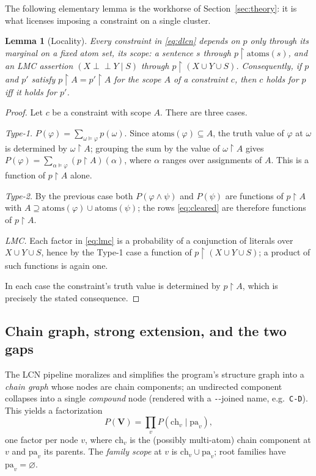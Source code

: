 \documentclass[11pt]{article}
\newtheorem{lemma}{Lemma}
\theoremstyle{definition}
\newcommand{\indep}{\perp\!\!\!\perp}
\newcommand{\ch}{\mathrm{ch}}
\newcommand{\pa}{\mathrm{pa}}
\newcommand{\atoms}{\mathrm{atoms}}
\newcommand{\restr}{\!\restriction\!}
\begin{document}
The following elementary lemma is the workhorse of Section~\ref{sec:theory}: it
is what licenses imposing a constraint on a single cluster.

\begin{lemma}[Locality]\label{lem:locality}
Every constraint in \eqref{eq:dlcn} depends on $p$ only through its marginal on a
fixed atom set, its \emph{scope}: a sentence $s$ through $p\restr\atoms(s)$, and
an LMC assertion $(X\indep Y\mid S)$ through $p\restr(X\cup Y\cup S)$.
Consequently, if $p$ and $p'$ satisfy $p\restr A=p'\restr A$ for the scope $A$ of
a constraint $c$, then $c$ holds for $p$ iff it holds for $p'$.
\end{lemma}

\begin{proof}
Let $c$ be a constraint with scope $A$. There are three cases.

\emph{Type-1.} $P(\varphi)=\sum_{\omega\models\varphi}p(\omega)$. Since
$\atoms(\varphi)\subseteq A$, the truth value of $\varphi$ at $\omega$ is
determined by $\omega\restr A$; grouping the sum by the value of $\omega\restr A$
gives $P(\varphi)=\sum_{\alpha\models\varphi}(p\restr A)(\alpha)$, where
$\alpha$ ranges over assignments of $A$. This is a function of $p\restr A$ alone.

\emph{Type-2.} By the previous case both $P(\varphi\wedge\psi)$ and $P(\psi)$
are functions of $p\restr A$ with
$A\supseteq\atoms(\varphi)\cup\atoms(\psi)$; the rows \eqref{eq:cleared} are
therefore functions of $p\restr A$.

\emph{LMC.} Each factor in \eqref{eq:lmc} is a probability of a conjunction of
literals over $X\cup Y\cup S$, hence by the Type-1 case a function of
$p\restr(X\cup Y\cup S)$; a product of such functions is again one.

In each case the constraint's truth value is determined by $p\restr A$, which is
precisely the stated consequence.
\end{proof}

\subsection{Chain graph, strong extension, and the two gaps}\label{sec:prelim-gaps}

The LCN pipeline moralizes and simplifies the program's structure graph into a
\emph{chain graph} whose nodes are chain components; an undirected component
collapses into a single \emph{compound} node (rendered with a \texttt{-}-joined
name, e.g.\ \texttt{C-D}). This yields a factorization
\begin{equation}\label{eq:factor}
  P(\mathbf V)=\prod_v P(\ch_v\mid\pa_v),
\end{equation}
one factor per node $v$, where $\ch_v$ is the (possibly multi-atom) chain
component at $v$ and $\pa_v$ its parents. The \emph{family scope} at $v$ is
$\ch_v\cup\pa_v$; root families have $\pa_v=\varnothing$.
\end{document}

